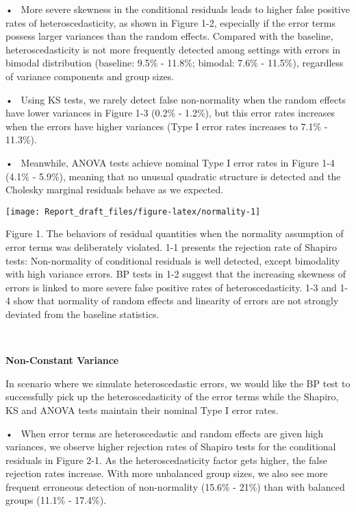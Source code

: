 \documentclass[12pt]{article}
\begin{document}
• ~More severe skewness in the conditional residuals leads to higher
false positive rates of heteroscedasticity, as shown in Figure 1-2,
especially if the error terms possess larger variances than the random
effects. Compared with the baseline, heteroscedasticity is not more
frequently detected among settings with errors in bimodal distribution
(baseline: 9.5\% - 11.8\%; bimodal: 7.6\% - 11.5\%), regardless of
variance components and group sizes.

• ~Using KS tests, we rarely detect false non-normality when the random
effects have lower variances in Figure 1-3 (0.2\% - 1.2\%), but this
error rates increases when the errors have higher variances (Type I
error rates increases to 7.1\% - 11.3\%).

• ~Meanwhile, ANOVA tests achieve nominal Type I error rates in Figure
1-4 (4.1\% - 5.9\%), meaning that no unusual quadratic structure is
detected and the Cholesky marginal residuals behave as we expected.

\begin{center}\texttt{[image: Report\_draft\_files/figure-latex/normality-1]} \end{center}

\vspace{-5pt}

\begin{spacing}{0.5}
\begingroup
{}\fontsize{6.5}{16}\selectfont
Figure 1. The behaviors of residual quantities when the normality assumption of error terms was deliberately violated.
1-1 presents the rejection rate of Shapiro tests: Non-normality of conditional residuals is well detected, except bimodality with high variance errors. BP tests in 1-2 suggest that the increasing skewness of errors is linked to more severe false positive rates of heteroscedasticity. 1-3 and 1-4 show that normality of random effects and linearity of errors are not strongly deviated from the baseline statistics. 
\endgroup
\end{spacing}

~

\textbf{Non-Constant Variance}

In scenario where we simulate heteroscedastic errors, we would like the
BP test to successfully pick up the heteroscedasticity of the error
terms while the Shapiro, KS and ANOVA tests maintain their nominal Type
I error rates.

• ~When error terms are heteroscedastic and random effects are given
high variances, we observe higher rejection rates of Shapiro tests for
the conditional residuals in Figure 2-1. As the heteroscedasticity
factor gets higher, the false rejection rates increase. With more
unbalanced group sizes, we also see more frequent erroneous detection of
non-normality (15.6\% - 21\%) than with balanced groups (11.1\% -
17.4\%).
\end{document}
